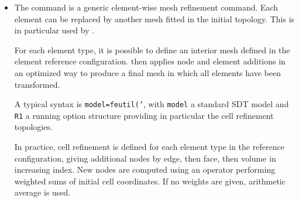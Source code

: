 \begin{itemize}

\item The  command is a generic element-wise mesh refinement command. Each element can be replaced by another mesh fitted in the initial topology. This is in particular used by .

For each element type, it is possible to define an interior mesh defined in the element reference configuration.  then applies node and element additions in an optimized way to produce a final mesh in which all elements have been transformed.

A typical syntax is {\tt model=feutil('}, with {\tt model} a standard SDT model and {\tt R1} a running option structure providing in particular the cell refinement topologies.

In practice, cell refinement is defined for each element type in the reference configuration, giving additional nodes by edge, then face, then volume in increasing index. New nodes are computed using an operator performing weighted sums of initial cell coordinates. If no weights are given, arithmetic average is used.


\end{itemize}
